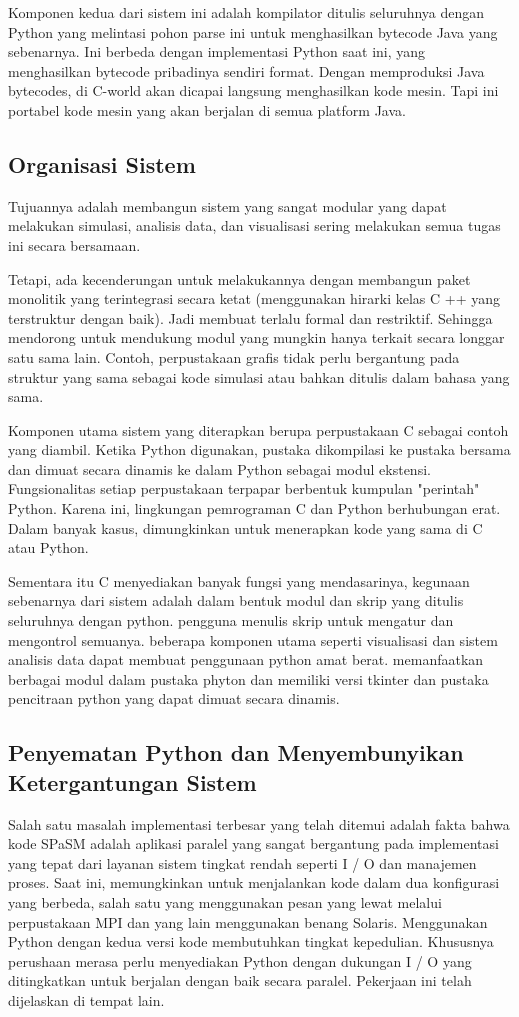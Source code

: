 \documentclass[12pt,a4paper]{article}
\begin{document}
Komponen kedua dari sistem ini adalah kompilator ditulis seluruhnya dengan Python yang melintasi pohon parse ini untuk menghasilkan bytecode Java yang sebenarnya. Ini berbeda dengan implementasi Python saat ini, yang menghasilkan bytecode pribadinya sendiri format. Dengan memproduksi Java bytecodes, di C-world akan dicapai langsung menghasilkan kode mesin. Tapi ini portabel kode mesin yang akan berjalan di semua platform Java.

\subsection{Organisasi Sistem}

Tujuannya adalah membangun sistem yang sangat modular yang dapat melakukan simulasi, analisis data, dan visualisasi sering melakukan semua tugas ini secara bersamaan. 

Tetapi, ada kecenderungan untuk melakukannya dengan membangun paket monolitik yang terintegrasi secara ketat (menggunakan hirarki kelas C ++ yang terstruktur dengan baik). Jadi membuat  terlalu formal dan restriktif.  Sehingga mendorong untuk mendukung modul yang mungkin hanya terkait secara longgar satu sama lain. Contoh, perpustakaan grafis tidak perlu bergantung pada struktur yang sama sebagai kode simulasi atau bahkan ditulis dalam bahasa yang sama.

Komponen utama sistem yang diterapkan  berupa perpustakaan C sebagai contoh yang diambil. Ketika Python digunakan, pustaka dikompilasi ke pustaka bersama dan dimuat secara dinamis ke dalam Python sebagai modul ekstensi. Fungsionalitas setiap perpustakaan terpapar berbentuk kumpulan "perintah" Python. Karena ini, lingkungan pemrograman C dan Python berhubungan erat. Dalam banyak kasus, dimungkinkan untuk menerapkan kode yang sama di C atau Python. 

Sementara itu C menyediakan banyak fungsi yang mendasarinya, kegunaan sebenarnya dari sistem adalah dalam bentuk modul dan skrip yang ditulis seluruhnya dengan python. pengguna menulis skrip untuk mengatur dan mengontrol semuanya. beberapa komponen utama seperti visualisasi dan sistem analisis data dapat membuat penggunaan python amat berat. memanfaatkan berbagai modul dalam pustaka phyton dan memiliki versi tkinter dan pustaka pencitraan python yang dapat dimuat secara dinamis.

\subsection{Penyematan Python dan Menyembunyikan Ketergantungan Sistem}
Salah satu masalah implementasi terbesar yang telah ditemui adalah fakta bahwa kode SPaSM adalah aplikasi paralel yang sangat bergantung pada implementasi yang tepat dari layanan sistem tingkat rendah seperti I / O dan manajemen proses. Saat ini, memungkinkan untuk menjalankan kode dalam dua konfigurasi yang berbeda, salah satu yang menggunakan pesan yang lewat melalui perpustakaan MPI dan yang lain menggunakan benang Solaris. Menggunakan Python dengan kedua versi kode membutuhkan tingkat kepedulian. Khususnya perushaan merasa perlu menyediakan Python dengan dukungan I / O yang ditingkatkan untuk berjalan dengan baik secara paralel. Pekerjaan ini telah dijelaskan di tempat lain.
\end{document}
